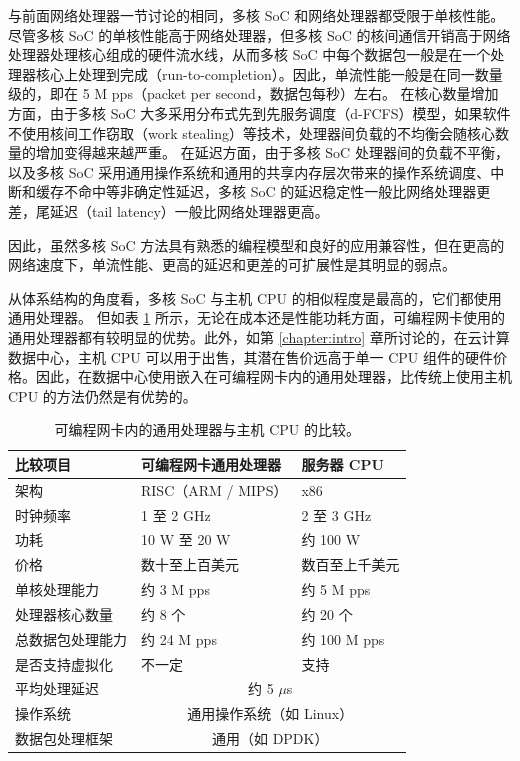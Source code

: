与前面网络处理器一节讨论的相同，多核 SoC 和网络处理器都受限于单核性能。
尽管多核 SoC 的单核性能高于网络处理器，但多核 SoC 的核间通信开销高于网络处理器处理核心组成的硬件流水线，从而多核 SoC 中每个数据包一般是在一个处理器核心上处理到完成（run-to-completion）。因此，单流性能一般是在同一数量级的，即在 5 M pps（packet per second，数据包每秒）左右。
在核心数量增加方面，由于多核 SoC 大多采用分布式先到先服务调度（d-FCFS）模型，如果软件不使用核间工作窃取（work stealing）等技术，处理器间负载的不均衡会随核心数量的增加变得越来越严重。
在延迟方面，由于多核 SoC 处理器间的负载不平衡，以及多核 SoC 采用通用操作系统和通用的共享内存层次带来的操作系统调度、中断和缓存不命中等非确定性延迟，多核 SoC 的延迟稳定性一般比网络处理器更差，尾延迟（tail latency）一般比网络处理器更高。

因此，虽然多核 SoC 方法具有熟悉的编程模型和良好的应用兼容性，但在更高的网络速度下，单流性能、更高的延迟和更差的可扩展性是其明显的弱点。

从体系结构的角度看，多核 SoC 与主机 CPU 的相似程度是最高的，它们都使用通用处理器。
但如表 \ref{background:tab:host-cpu} 所示，无论在成本还是性能功耗方面，可编程网卡使用的通用处理器都有较明显的优势。此外，如第 \ref{chapter:intro} 章所讨论的，在云计算数据中心，主机 CPU 可以用于出售，其潜在售价远高于单一 CPU 组件的硬件价格。因此，在数据中心使用嵌入在可编程网卡内的通用处理器，比传统上使用主机 CPU 的方法仍然是有优势的。

\begin{table}[htbp]
	\centering
	\caption{可编程网卡内的通用处理器与主机 CPU 的比较。}
	\small
	\begin{tabular}{l|p{}|p{}}
		\hline
		比较项目 & 可编程网卡通用处理器 & 服务器 CPU \\
		\hline
		\hline
		架构 & RISC（ARM / MIPS） & x86 \\
		\hline
		时钟频率 & 1 至 2 GHz & 2 至 3 GHz  \\
		\hline
		功耗 & 10 W 至 20 W & 约 100 W \\
		\hline
		价格 & 数十至上百美元 & 数百至上千美元 \\
		\hline
		单核处理能力 & 约 3 M pps & 约 5 M pps \\
		\hline
		处理器核心数量 & 约 8 个 & 约 20 个 \\
		\hline
		总数据包处理能力 & 约 24 M pps & 约 100 M pps \\
		\hline
		是否支持虚拟化 & 不一定 & 支持 \\
		\hline
		平均处理延迟 & \multicolumn{2}{c}{约 5 $\mu$s} \\
		\hline
		操作系统 & \multicolumn{2}{c}{通用操作系统（如 Linux）} \\
		\hline 
		数据包处理框架 & \multicolumn{2}{c}{通用（如 DPDK）} \\
		\hline
	\end{tabular}
	\label{background:tab:host-cpu}
\end{table}



